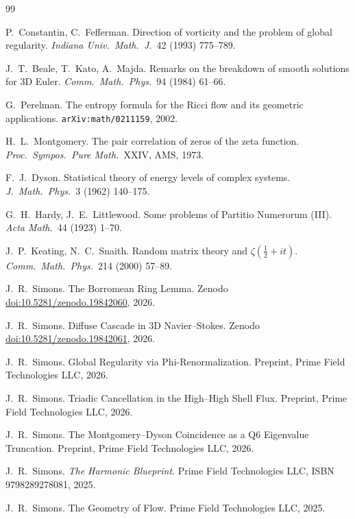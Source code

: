 \documentclass[12pt]{article}
\newcommand{\half}{\tfrac{1}{2}}
\begin{document}
\begin{thebibliography}{99}

P.~Constantin, C.~Fefferman.
Direction of vorticity and the problem of global regularity.
\textit{Indiana Univ.\ Math.\ J.}\ 42 (1993) 775--789.

J.~T.~Beale, T.~Kato, A.~Majda.
Remarks on the breakdown of smooth solutions for 3D Euler.
\textit{Comm.\ Math.\ Phys.}\ 94 (1984) 61--66.

G.~Perelman.
The entropy formula for the Ricci flow and its geometric applications.
\texttt{arXiv:math/0211159}, 2002.

H.~L.~Montgomery.
The pair correlation of zeros of the zeta function.
\textit{Proc.\ Sympos.\ Pure Math.}\ XXIV, AMS, 1973.

F.~J.~Dyson.
Statistical theory of energy levels of complex systems.
\textit{J.\ Math.\ Phys.}\ 3 (1962) 140--175.

G.~H.~Hardy, J.~E.~Littlewood.
Some problems of Partitio Numerorum (III).
\textit{Acta Math.}\ 44 (1923) 1--70.

J.~P.~Keating, N.~C.~Snaith.
Random matrix theory and $\zeta(\half+it)$.
\textit{Comm.\ Math.\ Phys.}\ 214 (2000) 57--89.

J.~R.~Simons.
The Borromean Ring Lemma.
Zenodo \href{https://doi.org/10.5281/zenodo.19842060}%
{doi:10.5281/zenodo.19842060}, 2026.

J.~R.~Simons.
Diffuse Cascade in 3D Navier--Stokes.
Zenodo \href{https://doi.org/10.5281/zenodo.19842061}%
{doi:10.5281/zenodo.19842061}, 2026.

J.~R.~Simons.
Global Regularity via Phi-Renormalization.
Preprint, Prime Field Technologies LLC, 2026.

J.~R.~Simons.
Triadic Cancellation in the High--High Shell Flux.
Preprint, Prime Field Technologies LLC, 2026.

J.~R.~Simons.
The Montgomery--Dyson Coincidence as a Q6 Eigenvalue Truncation.
Preprint, Prime Field Technologies LLC, 2026.

J.~R.~Simons.
\textit{The Harmonic Blueprint}.
Prime Field Technologies LLC, ISBN 9798289278081, 2025.

J.~R.~Simons.
The Geometry of Flow.
Prime Field Technologies LLC, 2025.

\end{thebibliography}
\end{document}
